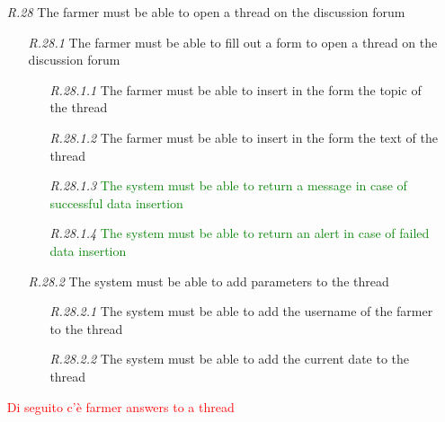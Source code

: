 \begin{itemize}
    \item [\textit{R.28}]The farmer must be able to open a thread on the discussion forum
    \begin{itemize}
        \item [\textit{R.28.1}] The farmer must be able to fill out a form to open a thread on the discussion forum
        \begin{itemize}
        \item [\textit{R.28.1.1}]The farmer must be able to insert in the form the topic of the thread
        \item [\textit{R.28.1.2}] The farmer must be able to insert in the form the text of the thread
        \item [\textit{R.28.1.3}] \textcolor{green}{The system must be able to return a message in case of successful data insertion}
        \item [\textit{R.28.1.4}] \textcolor{green}{The system must be able to return an alert in case of failed data insertion}
        \end{itemize}
        \item [\textit{R.28.2}] The system must be able to add parameters to the thread
    \begin{itemize}
    \item [\textit{R.28.2.1}] The system must be able to add the username of the farmer to the thread
    \item [\textit{R.28.2.2}] The system must be able to add the current date to the thread
    \end{itemize}
    \end{itemize}
    
    \textcolor{red}{Di seguito c'è farmer answers to a thread}
    

\end{itemize}
